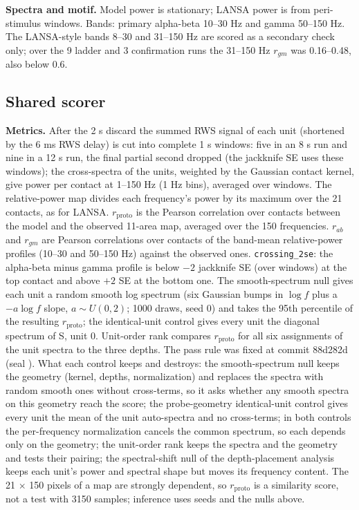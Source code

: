 \textbf{Spectra and motif.} Model power is stationary; LANSA power is from peri-stimulus windows. Bands:
primary alpha-beta 10--30 Hz and gamma 50--150 Hz. The LANSA-style bands 8--30 and 31--150 Hz are scored as a secondary check only; over the 9 ladder and 3 confirmation runs the 31--150 Hz $r_{gm}$ was 0.16--0.48, also below 0.6.

\subsection{Shared scorer}

\textbf{Metrics.} After the 2 s discard the summed RWS signal of each unit (shortened by the 6 ms RWS delay) is cut into complete 1 s windows: five in an 8 s run and nine in a 12 s run, the final partial second dropped (the jackknife SE uses these windows); the cross-spectra
of the units, weighted by the Gaussian contact kernel, give power per contact at 1--150 Hz (1 Hz bins), averaged over
windows. The relative-power map divides each frequency's power by its maximum over the 21 contacts, as for LANSA.
$r_\text{proto}$ is the Pearson correlation over contacts between the model and the observed 11-area map, averaged
over the 150 frequencies. $r_{ab}$ and $r_{gm}$ are Pearson correlations over contacts of the band-mean relative-power
profiles (10--30 and 50--150 Hz) against the observed ones. \texttt{crossing\_2se}: the alpha-beta minus gamma profile
is below $-2$ jackknife SE (over windows) at the top contact and above $+2$ SE at the bottom one. The smooth-spectrum
null gives each unit a random smooth log spectrum (six Gaussian bumps in $\log f$ plus a $-a\log f$ slope, $a \sim
U(0,2)$; 1000 draws, seed 0) and takes the 95th percentile of the resulting $r_\text{proto}$; the identical-unit
control gives every unit the diagonal spectrum of S, unit 0. Unit-order rank compares $r_\text{proto}$ for all six assignments of the
unit spectra to the three depths. The pass rule was fixed at commit 88d282d (seal ).
What each control keeps and destroys: the smooth-spectrum null keeps the geometry (kernel, depths, normalization) and
replaces the spectra with random smooth ones without cross-terms, so it asks whether any smooth spectra on this
geometry reach the score; the probe-geometry identical-unit control gives every unit the mean of the unit auto-spectra and no cross-terms; in both controls the per-frequency normalization cancels the common spectrum, so each depends only on the geometry; the unit-order rank keeps the spectra and the geometry and tests their pairing; the spectral-shift null of the
depth-placement analysis keeps each unit's power and spectral shape but moves its frequency content. The 21 $\times$
150 pixels of a map are strongly dependent, so $r_\text{proto}$ is a similarity score, not a test with 3150 samples;
inference uses seeds and the nulls above.

